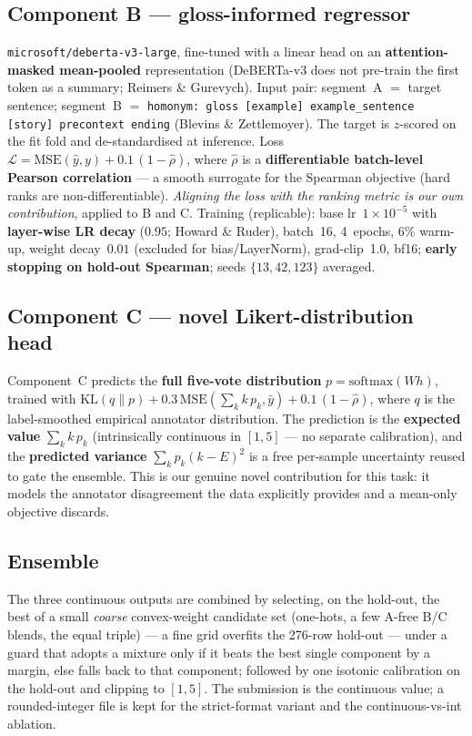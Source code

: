 \documentclass[11pt]{article}
\begin{document}
\subsection{Component B --- gloss-informed regressor}
\texttt{microsoft/deberta-v3-large}, fine-tuned with a linear head on an
\textbf{attention-masked mean-pooled} representation (DeBERTa-v3 does not
pre-train the first token as a summary; Reimers \& Gurevych). Input pair:
segment~A $=$ target sentence; segment~B $=$ \texttt{homonym: gloss
[example] example\_sentence [story] precontext ending} (Blevins \&
Zettlemoyer). The target is $z$-scored on the fit fold and de-standardised at
inference. Loss
$\mathcal{L}=\mathrm{MSE}(\hat y,y)+0.1\,(1-\hat\rho)$, where $\hat\rho$ is a
\textbf{differentiable batch-level Pearson correlation} --- a smooth
surrogate for the Spearman objective (hard ranks are non-differentiable).
\emph{Aligning the loss with the ranking metric is our own contribution},
applied to B and C. Training (replicable): base lr~$1\!\times\!10^{-5}$ with
\textbf{layer-wise LR decay} ($0.95$; Howard \& Ruder), batch~16, 4~epochs,
6\% warm-up, weight decay~$0.01$ (excluded for bias/LayerNorm), grad-clip~1.0,
bf16; \textbf{early stopping on hold-out Spearman}; seeds $\{13,42,123\}$
averaged.

\subsection{Component C --- novel Likert-distribution head}
Component~C predicts the \textbf{full five-vote distribution}
$p=\mathrm{softmax}(Wh)$, trained with
$\mathrm{KL}(q\|p)+0.3\,\mathrm{MSE}(\sum_k k\,p_k,\bar y)+0.1\,(1-\hat\rho)$,
where $q$ is the label-smoothed empirical annotator distribution. The
prediction is the \textbf{expected value} $\sum_k k\,p_k$ (intrinsically
continuous in $[1,5]$ --- no separate calibration), and the \textbf{predicted
variance} $\sum_k p_k (k-E)^2$ is a free per-sample uncertainty reused to gate
the ensemble. This is our genuine novel contribution for this task: it models
the annotator disagreement the data explicitly provides and a mean-only
objective discards.

\subsection{Ensemble}
The three continuous outputs are combined by selecting, on the hold-out, the
best of a small \emph{coarse} convex-weight candidate set (one-hots, a few
A-free B/C blends, the equal triple) --- a fine grid overfits the 276-row
hold-out --- under a guard that adopts a mixture only if it beats the best
single component by a margin, else falls back to that component; followed by
one isotonic calibration on the hold-out and clipping to $[1,5]$. The
submission is the continuous value; a rounded-integer file is kept for the
strict-format variant and the continuous-vs-int ablation.
\end{document}
